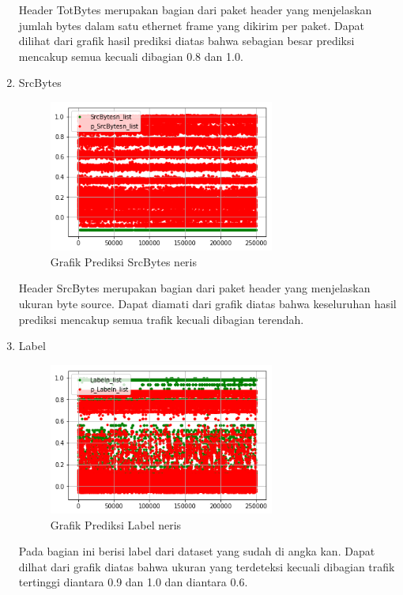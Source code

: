 \documentclass[./skripsi.tex]{subfiles}
\begin{document}
\begin{enumerate}
    \par Header TotBytes merupakan bagian dari paket header yang menjelaskan jumlah bytes dalam satu ethernet frame yang dikirim per paket. Dapat dilihat dari grafik hasil prediksi diatas bahwa sebagian besar prediksi mencakup semua kecuali dibagian 0.8 dan 1.0.
    
    \item SrcBytes
    \begin{figure}%
        \centering
        \includegraphics[width=0.7\textwidth]{public/assets/img/lstmm_neris_pred9.png}
        \caption{Grafik Prediksi SrcBytes neris}
        \label{fig:lstmm_neris_pred9}
    \end{figure}
    
    \par Header SrcBytes merupakan bagian dari paket header yang menjelaskan ukuran byte source. Dapat diamati dari grafik diatas bahwa keseluruhan hasil prediksi mencakup semua trafik kecuali dibagian terendah.
    \item Label
    \begin{figure}%
        \centering
        \includegraphics[width=0.7\textwidth]{public/assets/img/lstmm_neris_pred10.png}
        \caption{Grafik Prediksi Label neris}
        \label{fig:lstmm_neris_pred10}
    \end{figure}
    
    \par Pada bagian ini berisi label dari dataset yang sudah di angka kan. Dapat dilhat dari grafik diatas bahwa ukuran yang terdeteksi kecuali dibagian trafik tertinggi diantara 0.9 dan 1.0 dan diantara 0.6.
\end{enumerate}
\end{document}
